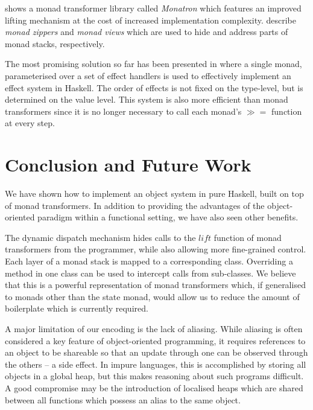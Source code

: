 \documentclass[runningheads,a4paper]{llncs}
\begin{document}
\cite{jaskelioff2011monatron} shows a monad transformer library called \emph{Monatron} which features an improved lifting mechanism at the cost of increased implementation complexity. \cite{schrijvers2011monads} describe \emph{monad zippers} and \emph{monad views} which are used to hide and address parts of monad stacks, respectively.

The most promising solution so far has been presented in \cite{kiselyov2013extensible} where a single monad, parameterised over a set of effect handlers \cite{plotkin2009handlers} is used to effectively implement an effect system in Haskell. The order of effects is not fixed on the type-level, but is determined on the value level. This system is also more efficient than monad transformers since it is no longer necessary to call each monad's $\gg\!\!=$ function at every step. 

\section{Conclusion and Future Work}
\label{sec:conclusions}

We have shown how to implement an object system in pure Haskell, built on top of monad transformers. In addition to providing the advantages of the object-oriented paradigm within a functional setting, we have also seen other benefits.

The dynamic dispatch mechanism hides calls to the $\mathit{lift}$ function of monad transformers from the programmer, while also allowing more fine-grained control. Each layer of a monad stack is mapped to a corresponding class. Overriding a method in one class can be used to intercept calls from sub-classes. We believe that this is a powerful representation of monad transformers which, if generalised to monads other than the state monad, would allow us to reduce the amount of boilerplate which is currently required.

A major limitation of our encoding is the lack of aliasing. While aliasing is often considered a key feature of object-oriented programming, it requires references to an object to be shareable so that an update through one can be observed through the others -- a side effect. In impure languages, this is accomplished by storing all objects in a global heap, but this makes reasoning about such programs difficult. A good compromise may be the introduction of localised heaps which are shared between all functions which possess an alias to the same object. 
\end{document}
